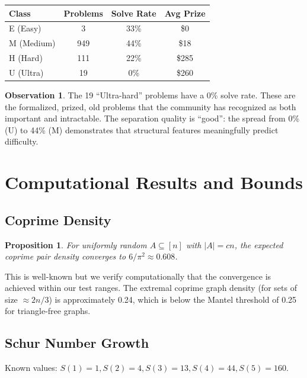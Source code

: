 \documentclass[11pt,a4paper]{article}
\newtheorem{proposition}[theorem]{Proposition}
\theoremstyle{definition}
\newtheorem{observation}[theorem]{Observation}
\theoremstyle{remark}
\begin{document}
\begin{center}
\begin{tabular}{lccc}
\toprule
Class & Problems & Solve Rate & Avg Prize \\
\midrule
E (Easy) & 3 & 33\% & \$0 \\
M (Medium) & 949 & 44\% & \$18 \\
H (Hard) & 111 & 22\% & \$285 \\
U (Ultra) & 19 & 0\% & \$260 \\
\bottomrule
\end{tabular}
\end{center}

\begin{observation}
The 19 ``Ultra-hard'' problems have a 0\% solve rate. These are the formalized,
prized, old problems that the community has recognized as both important and
intractable. The separation quality is ``good'': the spread from 0\% (U) to
44\% (M) demonstrates that structural features meaningfully predict difficulty.
\end{observation}

\section{Computational Results and Bounds}

\subsection{Coprime Density}

\begin{proposition}
For uniformly random $A \subseteq [n]$ with $|A| = cn$, the expected coprime
pair density converges to $6/\pi^2 \approx 0.608$.
\end{proposition}

This is well-known but we verify computationally that the convergence is
achieved within our test ranges. The extremal coprime graph density (for sets
of size $\approx 2n/3$) is approximately 0.24, which is below the Mantel
threshold of 0.25 for triangle-free graphs.

\subsection{Schur Number Growth}

Known values: $S(1)=1, S(2)=4, S(3)=13, S(4)=44, S(5)=160$.
\end{document}
